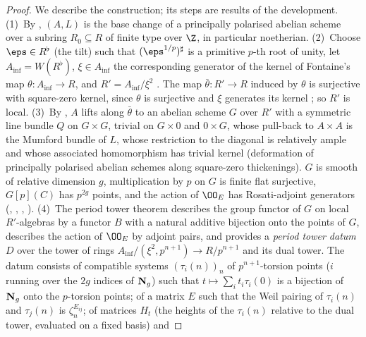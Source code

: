 \begin{proof}
We describe the construction; its steps are results of the development.
(1)~By , $(A,L)$ is the base change of a
principally polarised abelian scheme over a subring $R_0\subseteq R$ of finite type over $\Z$, in particular
noetherian. (2)~Choose $\eps\in R^\flat$ (the tilt) such that $(\eps^{1/p})^\sharp$ is a primitive $p$-th root
of unity, let $A_{\inf}=W(R^\flat)$, $\xi\in A_{\inf}$ the corresponding generator of the kernel of Fontaine's map
$\theta\colon A_{\inf}\to R$, and $R'=A_{\inf}/\xi^2$ \cite{Fontaine1982,Fontaine1994}. The map
$\bar\theta\colon R'\to R$ induced by $\theta$ is surjective with square-zero kernel, since $\theta$ is surjective and
$\xi$ generates its kernel \cite{Fontaine1994}; so $R'$ is local. (3)~By ,
$A$ lifts along $\bar\theta$ to an abelian scheme $G$ over $R'$ with a symmetric line bundle $Q$ on $G\times G$,
trivial on $G\times0$ and $0\times G$, whose pull-back to $A\times A$ is the Mumford bundle of $L$, whose
restriction to the diagonal is relatively ample and whose associated homomorphism has trivial kernel
(deformation of principally polarised abelian schemes along square-zero thickenings). $G$ is smooth of relative
dimension $g$, multiplication by $p$ on $G$ is finite flat surjective, $G[p](C)$ has $p^{2g}$ points, and the
action of $\OO_E$ has Rosati-adjoint generators
(,
,
,
). (4)~The period tower theorem 
describes the group functor of $G$ on local $R'$-algebras by a functor $B$ with a natural additive bijection onto
the points of $G$, describes the action of $\OO_E$ by adjoint pairs, and provides a \emph{period tower datum}
$D$ over the tower of rings $A_{\inf}/(\xi^2,p^{n+1})\to R/p^{n+1}$ and its dual tower. The datum consists of
compatible systems $(\tau_i(n))_n$ of $p^{n+1}$-torsion points ($i$ running over the $2g$ indices of
$\mathbf N_g$) such that $t\mapsto\sum_it_i\tau_i(0)$ is a bijection of $\mathbf N_g$ onto the $p$-torsion
points; of a matrix $E$ such that the Weil pairing of $\tau_i(n)$ and $\tau_j(n)$ is $\zeta_n^{E_{ij}}$; of
matrices $H_t$ (the heights of the $\tau_i(n)$ relative to the dual tower, evaluated on a fixed basis) and

\end{proof}

